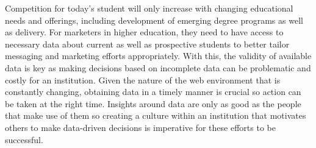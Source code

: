 \documentclass[sigconf]{acmart}
\begin{document}
Competition for today's student will only increase with changing educational needs and offerings, including development of emerging degree programs as well as delivery. For marketers in higher education, they need to have access to necessary data about current as well as prospective students to better tailor messaging and marketing efforts appropriately. With this, the validity of available data is key as making decisions based on incomplete data can be problematic and costly for an institution. Given the nature of the web environment that is constantly changing, obtaining data in a timely manner is crucial so action can be taken at the right time. Insights around data are only as good as the people that make use of them so creating a culture within an institution that motivates others to make data-driven decisions is imperative for these efforts to be successful.   






 
\end{document}
